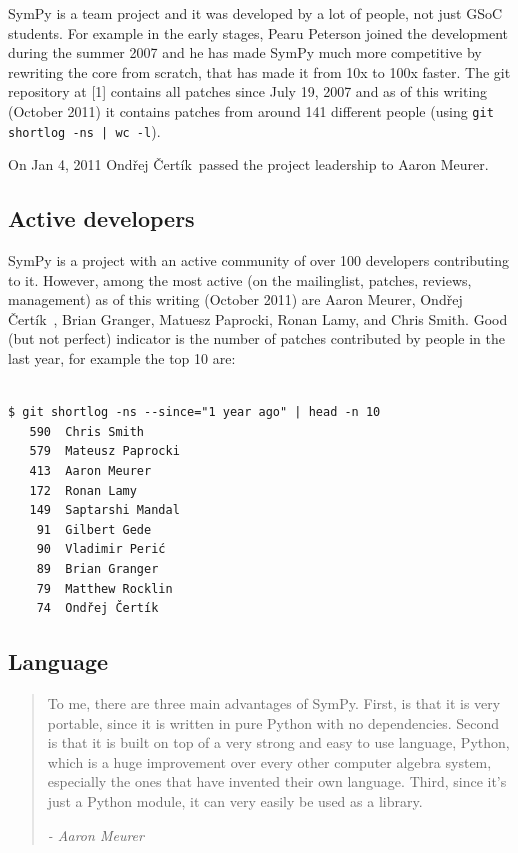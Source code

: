 \documentclass[12pt]{article}
\def\OC{Ond\v rej \v Cert\' ik\ }
\begin{document}
\noindent
SymPy is a team project and it was developed by a lot of people, not
just GSoC students. For example in the early stages, Pearu Peterson
joined the development during the summer 2007 and he has made SymPy much more
competitive by rewriting the core from scratch, that has made it from 10x to
100x faster. The git repository at [1] contains all patches since July 19, 2007
and as of this writing (October 2011) it contains patches from around 141
different people (using {\tt git shortlog -ns | wc -l}).

On Jan 4, 2011 \OC passed the project leadership to Aaron Meurer.


\subsection{Active developers}

SymPy is a project with an active community of
over 100 developers contributing to it. However, among the most active (on the
mailinglist, patches, reviews, management) as of this writing (October 2011)
are Aaron Meurer, \OC, Brian Granger, Matuesz Paprocki, Ronan Lamy, and Chris
Smith. Good (but not perfect) indicator is the number of patches contributed by
people in the last year, for example the top 10 are:

\begin{Verbatim}[fontsize=\scriptsize,fontfamily=courier,fontshape=tt,frame=single,label=git-log]

$ git shortlog -ns --since="1 year ago" | head -n 10
   590  Chris Smith
   579  Mateusz Paprocki
   413  Aaron Meurer
   172  Ronan Lamy
   149  Saptarshi Mandal
    91  Gilbert Gede
    90  Vladimir Perić
    89  Brian Granger
    79  Matthew Rocklin
    74  Ondřej Čertík
\end{Verbatim}


\subsection{Language}

\begin{quotation}
To me, there are three main
advantages of SymPy.  First, is that it is very portable,
since it is written in pure Python with no dependencies.
Second is that it is built on top of a very strong and easy to use
language, Python, which is a huge improvement over every other
computer algebra system, especially the ones that have invented their
own language.  Third, since it's just a Python module, it can very
easily be used as a library. 

{\em - Aaron Meurer}
\end{quotation}
\end{document}
